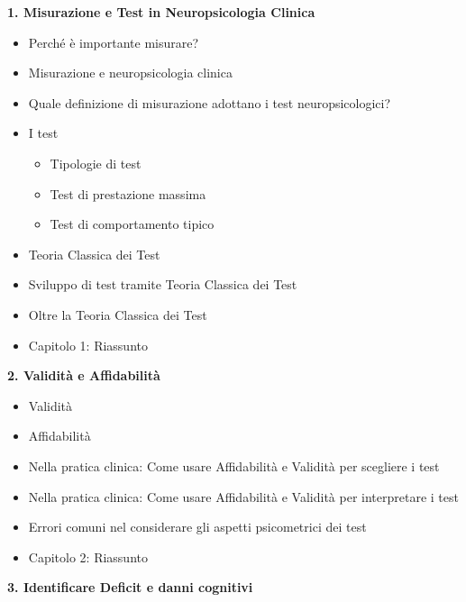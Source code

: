 \documentclass[
  italian,
  letterpaper,
  paper=6in:9in,
  pagesize=pdftex,
  headinclude=on,
  footinclude=on,
  11pt]{scrbook}
\providecommand{\tightlist}{%
  \setlength{\itemsep}{0pt}\setlength{\parskip}{0pt}}
\begin{document}
\textbf{1. Misurazione e Test in Neuropsicologia Clinica}

\begin{itemize}
\tightlist
\item
  Perché è importante misurare?
\item
  Misurazione e neuropsicologia clinica
\item
  Quale definizione di misurazione adottano i test neuropsicologici?
\item
  I test

  \begin{itemize}
  \tightlist
  \item
    Tipologie di test
  \item
    Test di prestazione massima
  \item
    Test di comportamento tipico
  \end{itemize}
\item
  Teoria Classica dei Test
\item
  Sviluppo di test tramite Teoria Classica dei Test
\item
  Oltre la Teoria Classica dei Test
\item
  Capitolo 1: Riassunto
\end{itemize}

\textbf{2. Validità e Affidabilità}

\begin{itemize}
\tightlist
\item
  Validità
\item
  Affidabilità
\item
  Nella pratica clinica: Come usare Affidabilità e Validità per
  scegliere i test
\item
  Nella pratica clinica: Come usare Affidabilità e Validità per
  interpretare i test
\item
  Errori comuni nel considerare gli aspetti psicometrici dei test
\item
  Capitolo 2: Riassunto
\end{itemize}

\textbf{3. Identificare Deficit e danni cognitivi}
\end{document}
